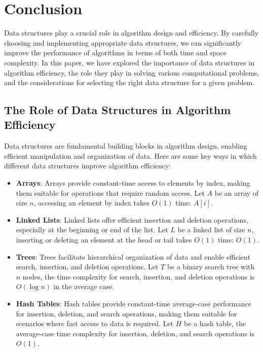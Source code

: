 \documentclass[12pt]{book} %
\begin{document}
\section{Conclusion}
Data structures play a crucial role in algorithm design and efficiency. By carefully choosing and implementing appropriate data structures, we can significantly improve the performance of algorithms in terms of both time and space complexity. In this paper, we have explored the importance of data structures in algorithm efficiency, the role they play in solving various computational problems, and the considerations for selecting the right data structure for a given problem.

\subsection{The Role of Data Structures in Algorithm Efficiency}
Data structures are fundamental building blocks in algorithm design, enabling efficient manipulation and organization of data. Here are some key ways in which different data structures improve algorithm efficiency:

\begin{itemize}
    \item \textbf{Arrays}: Arrays provide constant-time access to elements by index, making them suitable for operations that require random access. Let $A$ be an array of size $n$, accessing an element by index takes $O(1)$ time: $A[i]$.
    \item \textbf{Linked Lists}: Linked lists offer efficient insertion and deletion operations, especially at the beginning or end of the list. Let $L$ be a linked list of size $n$, inserting or deleting an element at the head or tail takes $O(1)$ time: $O(1)$.
    \item \textbf{Trees}: Trees facilitate hierarchical organization of data and enable efficient search, insertion, and deletion operations. Let $T$ be a binary search tree with $n$ nodes, the time complexity for search, insertion, and deletion operations is $O(\log n)$ in the average case.
    \item \textbf{Hash Tables}: Hash tables provide constant-time average-case performance for insertion, deletion, and search operations, making them suitable for scenarios where fast access to data is required. Let $H$ be a hash table, the average-case time complexity for insertion, deletion, and search operations is $O(1)$.
\end{itemize}
\end{document}
